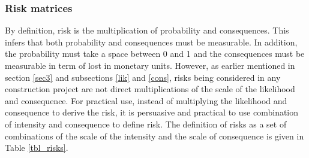 \documentclass[10pt,halfline,a4paper]{ouparticle}
\begin{document}
\subsubsection{Risk matrices}
By definition, risk is the multiplication of probability and consequences. This infers that both probability and consequences must be measurable. In addition, the probability must take a space between 0 and 1 and the consequences must be measurable in term of lost in monetary units. However, as earlier mentioned in section \ref{sec3} and subsections \ref{lik} and \ref{cons},  risks being considered in any construction project are not direct multiplications of the scale of the likelihood and consequence. For practical use, instead of multiplying the likelihood and consequence to derive the risk, it is persuasive and practical to use combination of intensity and consequence to define risk. The definition of risks as a set of combinations of the scale of the intensity and the scale of consequence is given in Table \ref{tbl_risks}.
\end{document}

